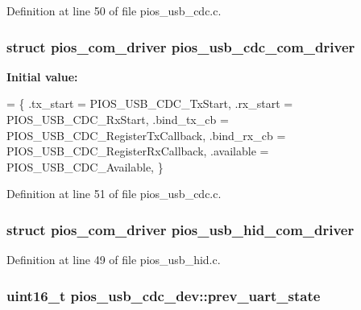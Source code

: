 Definition at line 50 of file pios\-\_\-usb\-\_\-cdc.\-c.

\hypertarget{group___p_i_o_s___u_s_b___c_o_m_gad661bf144c28ea36f290b0092e6957e2}{
\subsubsection[{pios\-\_\-usb\-\_\-cdc\-\_\-com\-\_\-driver}]{\setlength{\rightskip}{0pt plus 5cm}struct {\bf pios\-\_\-com\-\_\-driver} pios\-\_\-usb\-\_\-cdc\-\_\-com\-\_\-driver}}\label{group___p_i_o_s___u_s_b___c_o_m_gad661bf144c28ea36f290b0092e6957e2}
{\bfseries Initial value\-:}
\begin{DoxyCode}
= \{
        .tx\_start    = PIOS\_USB\_CDC\_TxStart,
        .rx\_start    = PIOS\_USB\_CDC\_RxStart,
        .bind\_tx\_cb  = PIOS\_USB\_CDC\_RegisterTxCallback,
        .bind\_rx\_cb  = PIOS\_USB\_CDC\_RegisterRxCallback,
        .available   = PIOS\_USB\_CDC\_Available,
\}
\end{DoxyCode}


Definition at line 51 of file pios\-\_\-usb\-\_\-cdc.\-c.

\hypertarget{group___p_i_o_s___u_s_b___c_o_m_ga7bc5f832e095cad60f463436e377bb5d}{
\subsubsection[{pios\-\_\-usb\-\_\-hid\-\_\-com\-\_\-driver}]{\setlength{\rightskip}{0pt plus 5cm}struct {\bf pios\-\_\-com\-\_\-driver} pios\-\_\-usb\-\_\-hid\-\_\-com\-\_\-driver}}\label{group___p_i_o_s___u_s_b___c_o_m_ga7bc5f832e095cad60f463436e377bb5d}


Definition at line 49 of file pios\-\_\-usb\-\_\-hid.\-c.

\hypertarget{group___p_i_o_s___u_s_b___c_o_m_ga945dfed2223e17061cb6e4257c2b2624}{
\subsubsection[{prev\-\_\-uart\-\_\-state}]{ {\bf uint16\-\_\-t} pios\-\_\-usb\-\_\-cdc\-\_\-dev\-::prev\-\_\-uart\-\_\-state}}\label{group___p_i_o_s___u_s_b___c_o_m_ga945dfed2223e17061cb6e4257c2b2624}


